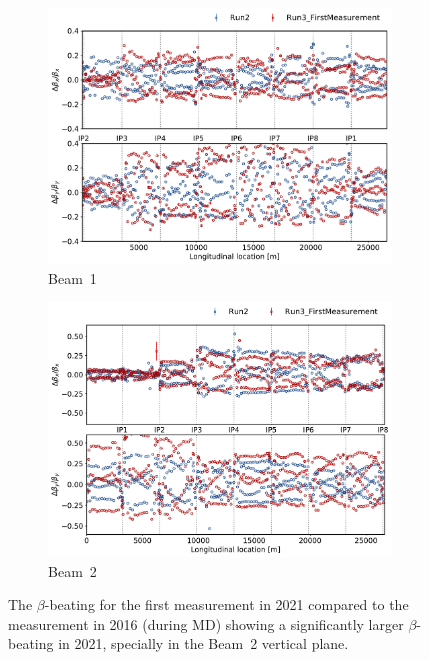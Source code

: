 \documentclass[a4paper]{cernatsnote}
\begin{document}
\begin{figure}[ht]
\begin{subfigure}{.5\textwidth}
  \centering
  \includegraphics[width=.99\linewidth]{plots/beam1/beta_beat_virgin_2016_2021.pdf}  
  \caption{Beam~1}
\end{subfigure}
\begin{subfigure}{.5\textwidth}
  \centering
  \includegraphics[width=.99\linewidth]{plots/beam2/B2_BetaBeat_2016_vs_first2021.pdf}  
  \caption{Beam~2}
\end{subfigure}
\caption{The $\beta$-beating for the first measurement in 2021 compared to the measurement in 2016 (during MD) showing a significantly larger $\beta$-beating in 2021, specially in the Beam~2 vertical plane.}
\label{fig:initalVs2016}
\end{figure}
\end{document}
